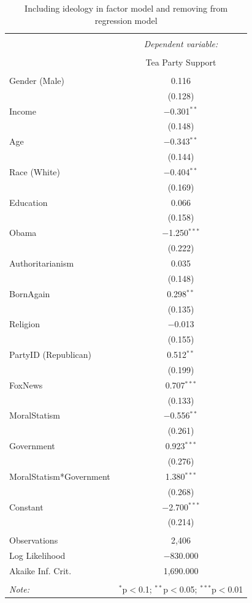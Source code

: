 \documentclass[12pt,]{article}
\begin{document}
\begin{table}[!htbp] \centering 
  \caption{Including ideology in factor model and removing from regression model} 
  \label{} 
\footnotesize 
\begin{tabular}{@{\extracolsep{5pt}}lc} 
\\[-1.8ex]\hline 
\hline \\[-1.8ex] 
 & \multicolumn{1}{c}{\textit{Dependent variable:}} \\ 
\cline{2-2} 
\\[-1.8ex] & Tea Party Support \\ 
\hline \\[-1.8ex] 
 Gender (Male) & 0.116 \\ 
  & (0.128) \\ 
  Income & $-$0.301$^{**}$ \\ 
  & (0.148) \\ 
  Age & $-$0.343$^{**}$ \\ 
  & (0.144) \\ 
  Race (White) & $-$0.404$^{**}$ \\ 
  & (0.169) \\ 
  Education & 0.066 \\ 
  & (0.158) \\ 
  Obama & $-$1.250$^{***}$ \\ 
  & (0.222) \\ 
  Authoritarianism & 0.035 \\ 
  & (0.148) \\ 
  BornAgain & 0.298$^{**}$ \\ 
  & (0.135) \\ 
  Religion & $-$0.013 \\ 
  & (0.155) \\ 
  PartyID (Republican) & 0.512$^{**}$ \\ 
  & (0.199) \\ 
  FoxNews & 0.707$^{***}$ \\ 
  & (0.133) \\ 
  MoralStatism & $-$0.556$^{**}$ \\ 
  & (0.261) \\ 
  Government & 0.923$^{***}$ \\ 
  & (0.276) \\ 
  MoralStatism*Government & 1.380$^{***}$ \\ 
  & (0.268) \\ 
  Constant & $-$2.700$^{***}$ \\ 
  & (0.214) \\ 
 \hline \\[-1.8ex] 
Observations & 2,406 \\ 
Log Likelihood & $-$830.000 \\ 
Akaike Inf. Crit. & 1,690.000 \\ 
\hline 
\hline \\[-1.8ex] 
\textit{Note:}  & \multicolumn{1}{r}{$^{*}$p$<$0.1; $^{**}$p$<$0.05; $^{***}$p$<$0.01} \\ 
\end{tabular} 
\end{table}
\end{document}
